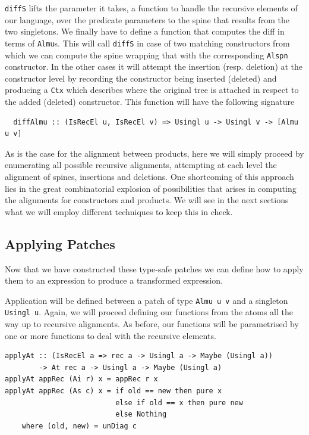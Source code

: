 \documentclass[11pt, titlepage]{article}
\begin{document}
\texttt{diffS} lifts the parameter it takes, a function to handle the 
recursive elements of our language, over the predicate parameters to the spine that results from the two singletons.
We finally have to define a function that computes the diff in terms of 
\texttt{Almu}s. This will call \texttt{diffS} in case of two matching constructors from which we can compute the spine wrapping that with the corresponding \texttt{Alspn} constructor. In the other cases it will attempt the insertion (resp. deletion) at the constructor level by recording the constructor being inserted (deleted) and producing a \texttt{Ctx} which describes where the original tree is attached in respect to the added (deleted) constructor.
This function will have the following signature

\begin{verbatim}
  diffAlmu :: (IsRecEl u, IsRecEl v) => Usingl u -> Usingl v -> [Almu u v]
\end{verbatim}

As is the case for the alignment between products, here we will simply proceed 
by enumerating all possible recursive alignments, attempting at each level 
the alignment of spines, insertions and deletions.
One shortcoming of this approach lies in the great combinatorial explosion of possibilities that arises in computing the alignments for constructors and products. We will see in the next sections what we will employ different techniques to keep this in check. 

\subsection{Applying Patches}\label{app_patches}

Now that we have constructed these type-safe patches we can define how to apply 
them to an expression to produce a transformed expression.

Application will be defined between a patch of type \texttt{Almu u v} and a 
singleton \texttt{Usingl u}. 
Again, we will proceed defining our functions from the atoms all the way up to 
recursive alignments. As before, our functions will be parametrised by one or 
more functions to deal with the recursive elements. 

\begin{verbatim}
applyAt :: (IsRecEl a => rec a -> Usingl a -> Maybe (Usingl a))
        -> At rec a -> Usingl a -> Maybe (Usingl a)
applyAt appRec (Ai r) x = appRec r x
applyAt appRec (As c) x = if old == new then pure x
                          else if old == x then pure new
                          else Nothing
    where (old, new) = unDiag c  
\end{verbatim}
\end{document}
